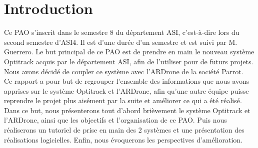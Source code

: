\chapter{Introduction}
	Ce PAO s'inscrit dans le semestre 8 du département ASI, c'est-à-dire lors du second semestre d'ASI4. Il est d'une durée d'un semestre et est suivi par M. Guerrero. Le but principal de ce PAO est de prendre en main le nouveau système Optitrack acquis par le département ASI, afin de l'utiliser pour de futurs projets. Nous avons décidé de coupler ce système avec l'ARDrone de la société Parrot. \\

	Ce rapport a pour but de regrouper l'ensemble des informations que nous avons apprises sur le système Optitrack et l'ARDrone, afin qu'une autre équipe puisse reprendre le projet plus aisément par la suite et améliorer ce qui a été réalisé. \\

	Dans ce but, nous présenterons tout d'abord brièvement le système Optitrack et l'ARDrone, ainsi que les objectifs et l'organisation de ce PAO\@. Puis nous réaliserons un tutoriel de prise en main des 2 systèmes et une présentation des réalisations logicielles. Enfin, nous évoquerons les perspectives d'amélioration.
